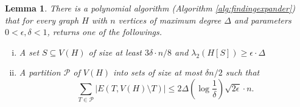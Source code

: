 \documentclass[11pt]{article}
\def\eps{\epsilon}
\newtheorem{lemma}{Lemma}[section]
\begin{document}
\begin{lemma}
\label{lem:graphdecomposition}
There is a 
polynomial algorithm (Algorithm \ref{alg:findingexpander}) that for every graph $H$ with $n$ vertices of maximum degree $\Delta$ and parameters $0 < \epsilon,\delta < 1$, returns one of the followings. 
\begin{enumerate}[i)]
\item \label{case:largeexpander} A set $S \subseteq V(H)$ of size at least 
$3\delta \cdot n/8$ and $\lambda_2(H[S]) \geq \eps\cdot \Delta$ 
\item \label{case:decomposition} A
partition $\mathcal{P}$ of $V(H)$ into sets of size at most $\delta n /2$ such that  
\begin{equation}
\label{eq:numberofedges}
\sum_{T \in \mathcal{P}} |E(T,V(H)\setminus{T})| \leq 2\Delta(\log \frac{1}{\delta})\sqrt{2\epsilon }\cdot n.
\end{equation}
\end{enumerate}

\end{lemma}
\end{document}
